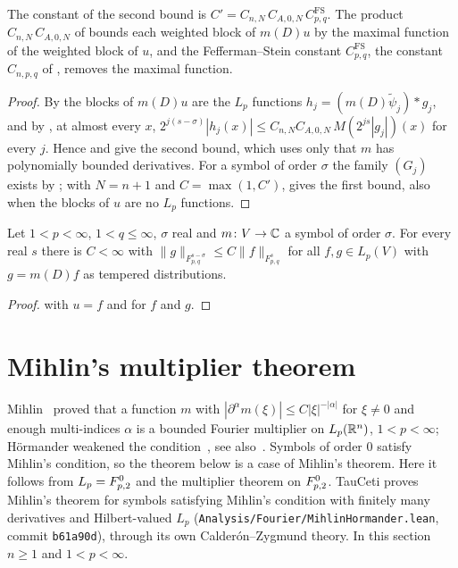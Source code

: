 The constant of the second bound is $C' = C_{n,N} \, C_{A,0,N} \, C^{\mathrm{FS}}_{p,q}$. The
product $C_{n,N} \, C_{A,0,N}$ of  bounds each weighted block of
$m(D) u$ by the maximal function of the weighted block of $u$, and the Fefferman--Stein constant
$C^{\mathrm{FS}}_{p,q}$, the constant $C_{n,p,q}$ of , removes the
maximal function.

\begin{proof}
\leanok
By  the blocks of $m(D) u$ are the $L_p$ functions
$h_j = (m(D) \tilde\psi_j) * g_j$, and by , at almost every $x$,
$2^{j(s - \sigma)} |h_j(x)| \leq C_{n,N} C_{A,0,N} \, M(2^{js} |g_j|)(x)$ for every $j$. Hence
 and  give the second bound, which
uses only that $m$ has polynomially bounded derivatives. For a symbol of order $\sigma$ the
family $(G_j)$ exists by ; with $N = n + 1$ and
$C = \max(1, C')$,  gives the first
bound, also when the blocks of $u$ are no $L_p$ functions.
\end{proof}

\begin{corollary}
\label{cor:tl-multiplier-lp}
\leanok
{}
Let $1 < p < \infty$, $1 < q \leq \infty$, $\sigma$ real and $m \colon V \to \mathbb{C}$ a symbol of order
$\sigma$. For every real $s$ there is $C < \infty$ with
$\|g\|_{F^{s-\sigma}_{p,q}} \leq C \|f\|_{F^s_{p,q}}$ for all $f, g \in L_p(V)$ with
$g = m(D) f$ as tempered distributions.
\end{corollary}

\begin{proof}
\leanok
{} with $u = f$ and  for $f$ and $g$.
\end{proof}

\section{Mihlin's multiplier theorem}
\label{sec:mihlin-multipliers}

Mihlin~\cite{Mihlin1956} proved that a function $m$ with
$|\partial^\alpha m(\xi)| \leq C |\xi|^{-|\alpha|}$ for $\xi \neq 0$ and enough multi-indices
$\alpha$ is a bounded Fourier multiplier on $L_p(\mathbb{R}^n)$, $1 < p < \infty$; H\"ormander weakened
the condition~\cite[Theorem~2.5]{Hormander1960}, see also~\cite[Theorem~6.2.7]{Grafakos}. Symbols
of order $0$ satisfy Mihlin's condition, so the theorem below is a case of Mihlin's theorem. Here
it follows from $L_p = F^{0}_{p,2}$ and the multiplier theorem on $F^{0}_{p,2}$. TauCeti proves
Mihlin's theorem for symbols satisfying Mihlin's condition with finitely many derivatives and
Hilbert-valued $L_p$
(\texttt{Analysis/\allowbreak Fourier/\allowbreak MihlinHormander.lean}, commit
\texttt{b61a90d}), through its own Calder\'on--Zygmund theory. In this section $n \geq 1$ and
$1 < p < \infty$.

